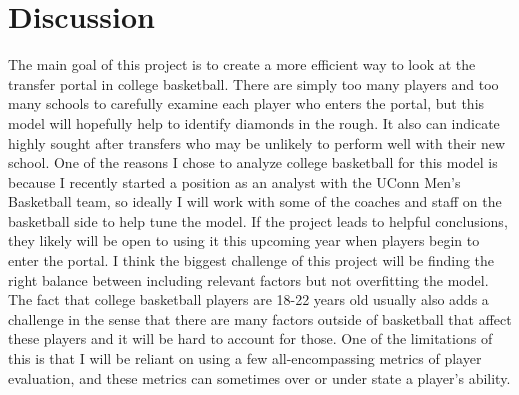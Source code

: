 \documentclass[12pt]{article}
\begin{document}
\section{Discussion}
\label{sec:discussion}
The main goal of this project is to create a more efficient way to look at the transfer portal in college basketball. There are simply too many players and too many schools to carefully examine each player who enters the portal, but this model will hopefully help to identify diamonds in the rough. It also can indicate highly sought after transfers who may be unlikely to perform well with their new school. One of the reasons I chose to analyze college basketball for this model is because I recently started a position as an analyst with the UConn Men's Basketball team, so ideally I will work with some of the coaches and staff on the basketball side to help tune the model. If the project leads to helpful conclusions, they likely will be open to using it this upcoming year when players begin to enter the portal. I think the biggest challenge of this project will be finding the right balance between including relevant factors but not overfitting the model. The fact that college basketball players are 18-22 years old usually also adds a challenge in the sense that there are many factors outside of basketball that affect these players and it will be hard to account for those. One of the limitations of this is that I will be reliant on using a few all-encompassing metrics of player evaluation, and these metrics can sometimes over or under state a player's ability.  
\end{document}
